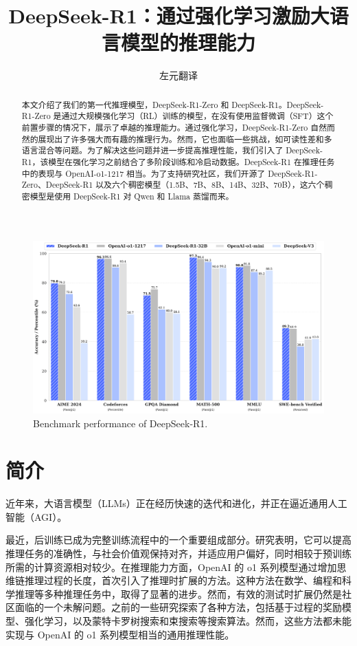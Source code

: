 \documentclass[lang=cn,a4paper,newtx]{elegantpaper}
\title{DeepSeek-R1：通过强化学习激励大语言模型的推理能力}
\author{左元翻译}
\newcommand{\dsri}{DeepSeek-R1}
\newcommand{\dsro}{DeepSeek-R1-Zero}
\begin{document}
\maketitle

\begin{abstract}
  本文介绍了我们的第一代推理模型，\dsro{} 和 DeepSeek-R1。\dsro{} 是通过大规模强化学习（RL）训练的模型，在没有使用监督微调（SFT）这个前置步骤的情况下，展示了卓越的推理能力。通过强化学习，\dsro{} 自然而然的展现出了许多强大而有趣的推理行为。然而，它也面临一些挑战，如可读性差和多语言混合等问题。为了解决这些问题并进一步提高推理性能，我们引入了 DeepSeek-R1，该模型在强化学习之前结合了多阶段训练和冷启动数据。DeepSeek-R1 在推理任务中的表现与 OpenAI-o1-1217 相当。为了支持研究社区，我们开源了 \dsro{}、DeepSeek-R1 以及六个稠密模型（1.5B、7B、8B、14B、32B、70B），这六个稠密模型是使用 \dsri{} 对 Qwen 和 Llama 蒸馏而来。
\end{abstract}

\begin{figure}[h]
\centering
\includegraphics[width=1.0\textwidth]{figures/dsr1_performance.pdf}
\caption{
    \centering
    Benchmark performance of \dsri{}.
}
\label{fig:dsv3_performance}
\end{figure}

\newpage

\tableofcontents

\newpage

\section{简介}

近年来，大语言模型（LLMs）正在经历快速的迭代和进化，并正在逼近通用人工智能（AGI）。

最近，后训练已成为完整训练流程中的一个重要组成部分。研究表明，它可以提高推理任务的准确性，与社会价值观保持对齐，并适应用户偏好，同时相较于预训练所需的计算资源相对较少。在推理能力方面，OpenAI 的 o1 系列模型通过增加思维链推理过程的长度，首次引入了推理时扩展的方法。这种方法在数学、编程和科学推理等多种推理任务中，取得了显著的进步。然而，有效的测试时扩展仍然是社区面临的一个未解问题。之前的一些研究探索了各种方法，包括基于过程的奖励模型、强化学习，以及蒙特卡罗树搜索和束搜索等搜索算法。然而，这些方法都未能实现与 OpenAI 的 o1 系列模型相当的通用推理性能。
\end{document}
